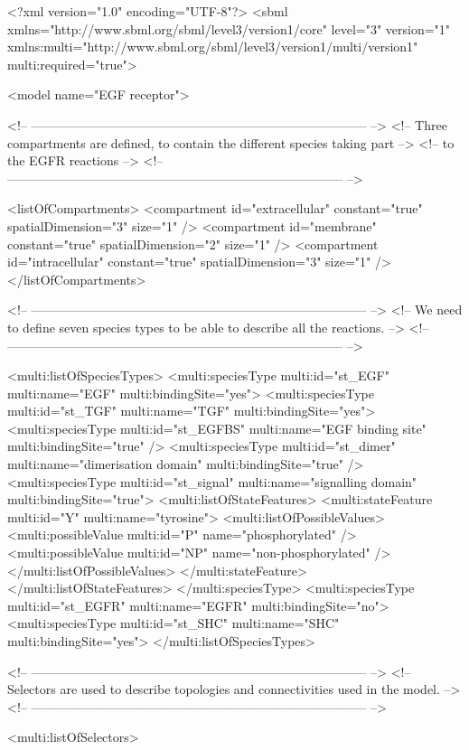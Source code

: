 \begin{example}
<?xml version="1.0" encoding="UTF-8"?>
<sbml xmlns="http://www.sbml.org/sbml/level3/version1/core" level="3" version="1"
      xmlns:multi="http://www.sbml.org/sbml/level3/version1/multi/version1"
      multi:required="true">

  <model name="EGF receptor">

<!-- -------------------------------------------------------------------------------- -->
<!-- Three compartments are defined, to contain the different species taking part     -->
<!-- to the EGFR reactions                                                            -->
<!-- -------------------------------------------------------------------------------- -->

    <listOfCompartments>
      <compartment id="extracellular" constant="true" spatialDimension="3" size="1" />
      <compartment id="membrane" constant="true" spatialDimension="2" size="1" />
      <compartment id="intracellular" constant="true" spatialDimension="3" size="1" />
    </listOfCompartments>

<!-- -------------------------------------------------------------------------------- -->
<!-- We need to define seven species types to be able to describe all the reactions.  -->
<!-- -------------------------------------------------------------------------------- -->

    <multi:listOfSpeciesTypes>
      <multi:speciesType multi:id="st_EGF" multi:name="EGF" multi:bindingSite="yes">
      <multi:speciesType multi:id="st_TGF" multi:name="TGF" multi:bindingSite="yes">
      <multi:speciesType multi:id="st_EGFBS" multi:name="EGF binding site" multi:bindingSite="true" />
      <multi:speciesType multi:id="st_dimer" multi:name="dimerisation domain" multi:bindingSite="true" />
      <multi:speciesType multi:id="st_signal" multi:name="signalling domain" multi:bindingSite="true">
         <multi:listOfStateFeatures>
           <multi:stateFeature multi:id="Y" multi:name="tyrosine">
             <multi:listOfPossibleValues>
               <multi:possibleValue multi:id="P" name="phosphorylated" />
               <multi:possibleValue multi:id="NP" name="non-phosphorylated" />
             </multi:listOfPossibleValues>
           </multi:stateFeature>
         </multi:listOfStateFeatures>
      </multi:speciesType>
      <multi:speciesType multi:id="st_EGFR" multi:name="EGFR" multi:bindingSite="no">   
      <multi:speciesType multi:id="st_SHC" multi:name="SHC" multi:bindingSite="yes">
    </multi:listOfSpeciesTypes>

<!-- -------------------------------------------------------------------------------- -->
<!-- Selectors are used to describe topologies and connectivities used in the model.  -->
<!-- -------------------------------------------------------------------------------- -->

    <multi:listOfSelectors>
\end{example}

